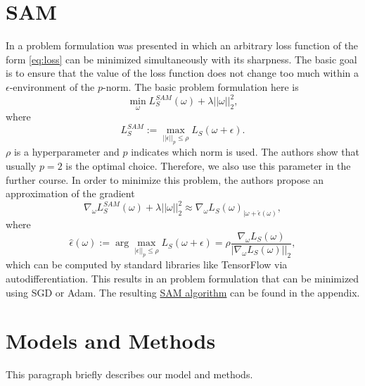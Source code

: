 \documentclass[10pt,conference,compsocconf]{IEEEtran}
\begin{document}
\section{SAM}
In \cite{foret2021sharpnessaware} a problem formulation was presented in which an arbitrary loss function of the form \eqref{eq:loss} can be minimized simultaneously with its sharpness. The basic goal is to ensure that the value of the loss function does not change too much within a $\epsilon$-environment of the $p$-norm. 
The basic problem formulation here is 
\begin{equation} \label{eq:sam_real}
\min_\omega L_S^{SAM}(\omega) + \lambda ||\omega||_2^2,
\end{equation}
where 
\begin{equation} \label{eq:sam_eps}
L_S^{SAM} := \max_{||\epsilon||_p \leq \rho} L_S(\omega + \epsilon).
\end{equation}
$\rho$ is a hyperparameter and $p$ indicates which norm is used. The authors show that usually $p = 2$ is the optimal choice. Therefore, we also use this parameter in the further course. 
In order to minimize this problem, the authors propose an approximation of the gradient 
\begin{equation} \label{eq:sam_approx}
\nabla_\omega L_S^{SAM}(\omega) + \lambda ||\omega||_2^2 \approx \nabla_\omega L_S(\omega)_{|\omega + \hat{\epsilon}(\omega)}, 
\end{equation}
where 
\begin{equation} \label{eq:sam_eps_hat}
\hat{\epsilon}(\omega) := \arg \max_{|\epsilon||_p \leq \rho} L_S(\omega + \epsilon) = \rho \frac{\nabla_\omega L_S(\omega)}{|\nabla_\omega L_S(\omega)||_2},
\end{equation}
 which can be computed by standard libraries like TensorFlow via autodifferentiation. This results in an problem formulation that can be minimized using SGD or Adam. 
The resulting \hyperref[alg:sam]{SAM algorithm} can be found in the appendix. 

\section{Models and Methods}
This paragraph briefly describes our model and methods. 
\end{document}

